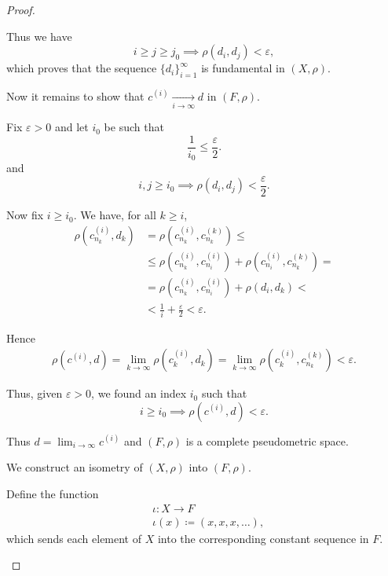 \begin{proof}
\begin{defenum}
    Thus we have
    \begin{equation*}
      i \geq j \geq j_0 \implies \rho(d_i, d_j) < \varepsilon,
    \end{equation*}
    which proves that the sequence \( \{ d_i \}_{i=1}^\infty \) is fundamental in \( (X, \rho) \).

    Now it remains to show that \( c^{(i)} \xrightarrow[i \to \infty]{} d \) in \( (F, \rho) \).

    Fix \( \varepsilon > 0 \) and let \( i_0 \) be such that
    \begin{equation*}
      \frac 1 {i_0} \leq \frac \varepsilon 2.
    \end{equation*}
    and
    \begin{equation*}
      i, j \geq i_0 \implies \rho(d_i, d_j) < \frac \varepsilon 2.
    \end{equation*}

    Now fix \( i \geq i_0 \). We have, for all \( k \geq i \),
    \begin{align*}
      \rho(c_{n_k}^{(i)}, d_k)
      &=
      \rho(c_{n_k}^{(i)}, c_{n_k}^{(k)})
      \leq \\ &\leq
      \rho(c_{n_k}^{(i)}, c_{n_i}^{(i)}) + \rho(c_{n_i}^{(i)}, c_{n_k}^{(k)})
      = \\ &=
      \rho(c_{n_k}^{(i)}, c_{n_i}^{(i)}) + \rho(d_i, d_k)
      < \\ &<
      \frac 1 i + \frac \varepsilon 2
      <
      \varepsilon.
    \end{align*}

    Hence
    \begin{align*}
      \rho(c^{(i)}, d)
      =
      \lim_{k \to \infty} \rho(c_k^{(i)}, d_k)
      =
      \lim_{k \to \infty} \rho(c_k^{(i)}, c_{n_k}^{(k)})
      <
      \varepsilon.
    \end{align*}

    Thus, given \( \varepsilon > 0 \), we found an index \( i_0 \) such that
    \begin{equation*}
      i \geq i_0 \implies \rho(c^{(i)}, d) < \varepsilon.
    \end{equation*}

    Thus \( d = \lim_{i \to \infty} c^{(i)} \) and \( (F, \rho) \) is a complete pseudometric space.

     We construct an isometry of \( (X, \rho) \) into \( (F, \rho) \).

    Define the function
    \begin{align*}
      &\iota: X \to F \\
      &\iota(x) \coloneqq (x, x, x, \ldots),
    \end{align*}
    which sends each element of \( X \) into the corresponding constant sequence in \( F \).


\end{defenum}
\end{proof}
